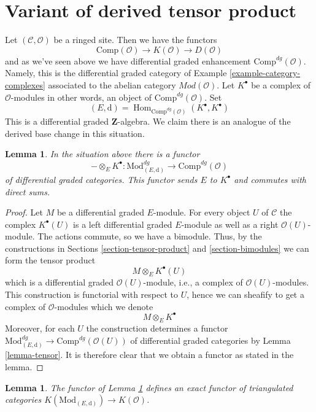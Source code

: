 \documentclass{stacks-project}
\theoremstyle{plain}
\newtheorem{lemma}[subsection]{Lemma}
\theoremstyle{definition}
\theoremstyle{remark}
\numberwithin{equation}{subsection}
\def\Hom{\mathop{\mathrm{Hom}}\nolimits}
\begin{document}
\section{Variant of derived tensor product}
\label{section-variant-base-change}

\noindent
Let $(\mathcal{C}, \mathcal{O})$ be a ringed site. Then we have the functors
$$
\text{Comp}(\mathcal{O}) \to K(\mathcal{O}) \to D(\mathcal{O})
$$
and as we've seen above we have differential graded enhancement
$\text{Comp}^{dg}(\mathcal{O})$. Namely, this is the differential
graded category of Example \ref{example-category-complexes} associated
to the abelian category $\textit{Mod}(\mathcal{O})$.
Let $K^\bullet$ be a complex of $\mathcal{O}$-modules in other
words, an object of $\text{Comp}^{dg}(\mathcal{O})$. Set
$$
(E, \text{d}) =
\Hom_{\text{Comp}^{dg}(\mathcal{O})}(K^\bullet, K^\bullet)
$$
This is a differential graded $\mathbf{Z}$-algebra. We claim there is
an analogue of the derived base change in this situation.

\begin{lemma}
\label{lemma-tensor-with-complex}
In the situation above there is a functor
$$
- \otimes_E K^\bullet :
\text{Mod}^{dg}_{(E, \text{d})}
\longrightarrow
\text{Comp}^{dg}(\mathcal{O})
$$
of differential graded categories. This functor sends $E$ to $K^\bullet$
and commutes with direct sums.
\end{lemma}

\begin{proof}
Let $M$ be a differential graded $E$-module. For every object $U$ of
$\mathcal{C}$ the complex $K^\bullet(U)$ is a left differential
graded $E$-module as well as a right $\mathcal{O}(U)$-module.
The actions commute, so we have a bimodule.
Thus, by the constructions in
Sections \ref{section-tensor-product} and \ref{section-bimodules}
we can form the tensor product
$$
M \otimes_E K^\bullet(U)
$$
which is a differential graded $\mathcal{O}(U)$-module, i.e., a complex
of $\mathcal{O}(U)$-modules. This construction is functorial with respect
to $U$, hence we can sheafify to get a complex of $\mathcal{O}$-modules
which we denote
$$
M \otimes_E K^\bullet
$$
Moreover, for each $U$ the construction determines a functor
$\text{Mod}^{dg}_{(E, \text{d})} \to \text{Comp}^{dg}(\mathcal{O}(U))$
of differential graded categories by Lemma \ref{lemma-tensor}.
It is therefore clear that we obtain a functor as stated in the lemma.
\end{proof}

\begin{lemma}
\label{lemma-tensor-with-complex-homotopy}
The functor of Lemma \ref{lemma-tensor-with-complex} defines an exact functor
of triangulated categories
$K(\text{Mod}_{(E, \text{d})}) \to K(\mathcal{O})$.
\end{lemma}
\end{document}
